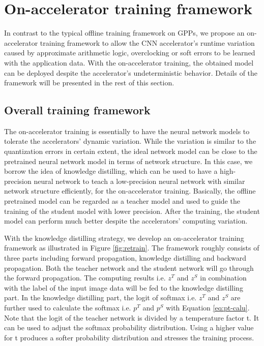 \section{On-accelerator training framework} \label{sec:framework}
In contrast to the typical offline training framework on GPPs, we propose an 
on-accelerator training framework to allow the CNN accelerator's runtime variation 
caused by approximate arithmetic logic, overclocking or soft errors 
to be learned with the application data. With the on-accelerator training,
the obtained model can be deployed despite the accelerator's 
undeterministic behavior. Details of the framework will be presented in 
the rest of this section.

\begin{figure*}
        \caption{On-accelerator training framework with knowledge distilling}
        \label{fig:retrain}
\end{figure*}


\subsection{Overall training framework}
The on-accelerator training is essentially to have the neural 
network models to tolerate the accelerators' dynamic variation. 
While the variation is similar to the quantization 
errors in certain extent, the ideal network model can be 
close to the pretrained neural network model in terms of 
network structure. In this case, we borrow the idea of knowledge 
distilling\cite{distillation_38, distillation_39}, 
which can be used to have a high-precision neural network to teach a 
low-precision neural network with similar network structure efficiently, 
for the on-accelerator training. Basically, the offline pretrained 
model can be regarded as a teacher model and used to guide the training of the 
student model with lower precision. After the training, the student model 
can perform much better despite the accelerators' computing variation.


With the knowledge distilling strategy, we develop an on-accelerator training 
framework as illustrated in Figure \ref{fig:retrain}. The framework roughly consists of three parts
including forward propagation, knowledge distilling and backward propagation. 
Both the teacher network and the student network will go through the 
forward propagation. The computing results i.e. $z^T$ and $z^S$ in 
combination with the label of the input image data will be fed to the 
knowledge distilling part. In the knowledge distilling part,  
the logit of softmax i.e. $z^T$ and $z^S$ are further used to calculate the 
softmax i.e. $p^T$ and $p^S$ with Equation \ref{eq:pt-calu}. 
Note that the logit of the teacher network is divided by a 
temperature factor t. It can be used to adjust the softmax 
probability distribution. Using a higher value for t 
produces a softer probability distribution and stresses 
the training process. 

